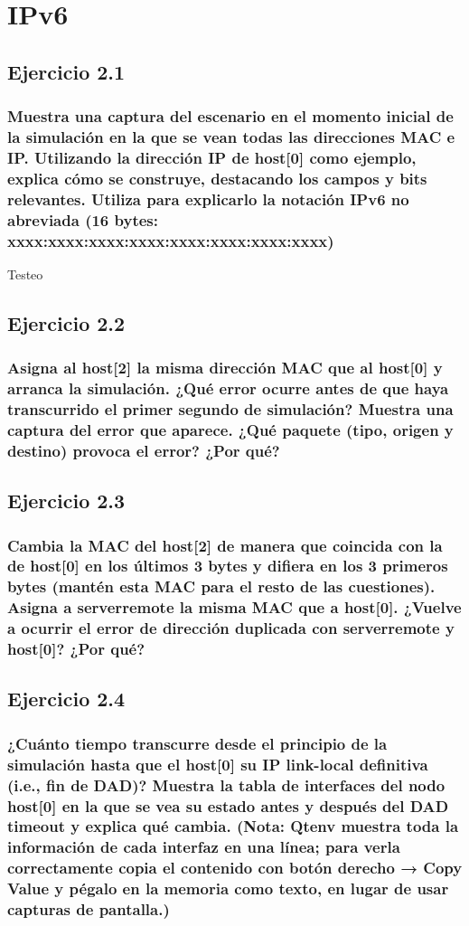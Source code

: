 \chapter{IPv6}
\label{chap:ipv6}

\section{Ejercicio 2.1}
\subsection{Muestra una captura del escenario en el momento inicial de la simulación en la que se vean todas las
direcciones MAC e IP. Utilizando la dirección IP de host[0] como ejemplo, explica cómo se construye, destacando
los campos y bits relevantes. Utiliza para explicarlo la notación IPv6 no abreviada (16 bytes:
xxxx:xxxx:xxxx:xxxx:xxxx:xxxx:xxxx:xxxx)}

Testeo

\section{Ejercicio 2.2}
\subsection{Asigna al host[2] la misma dirección MAC que al host[0] y arranca la simulación. ¿Qué error ocurre antes de
que haya transcurrido el primer segundo de simulación? Muestra una captura del error que aparece. ¿Qué
paquete (tipo, origen y destino) provoca el error? ¿Por qué?}

\section{Ejercicio 2.3}
\subsection{Cambia la MAC del host[2] de manera que coincida con la de host[0] en los últimos 3 bytes y difiera en los 3
primeros bytes (mantén esta MAC para el resto de las cuestiones). Asigna a serverremote la misma MAC que a
host[0]. ¿Vuelve a ocurrir el error de dirección duplicada con serverremote y host[0]? ¿Por qué?}

\section{Ejercicio 2.4}
\subsection{¿Cuánto tiempo transcurre desde el principio de la simulación hasta que el host[0] su IP link-local definitiva
(i.e., fin de DAD)? Muestra la tabla de interfaces del nodo host[0] en la que se vea su estado antes y después del
DAD timeout y explica qué cambia. (Nota: Qtenv muestra toda la información de cada interfaz en una línea;
para verla correctamente copia el contenido con botón derecho → Copy Value y pégalo en la memoria como
texto, en lugar de usar capturas de pantalla.)}

